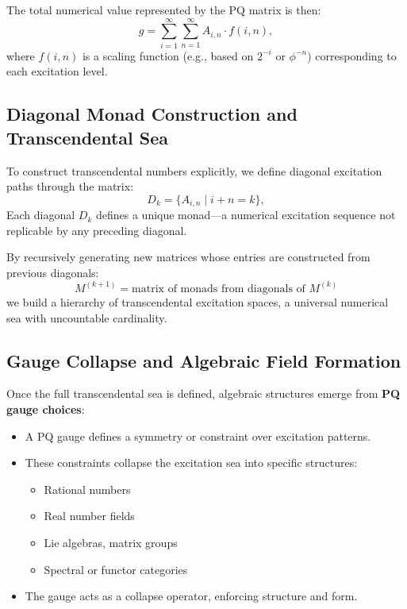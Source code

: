 \documentclass{article}
\begin{document}
The total numerical value represented by the PQ matrix is then:
\begin{equation}
    g = \sum_{i=1}^{\infty} \sum_{n=1}^{\infty} A_{i,n} \cdot f(i, n),
\end{equation}
where $f(i, n)$ is a scaling function (e.g., based on $2^{-i}$ or $\phi^{-n}$) corresponding to each excitation level.

\subsection{Diagonal Monad Construction and Transcendental Sea}

To construct transcendental numbers explicitly, we define diagonal excitation paths through the matrix:
\begin{equation}
    D_k = \{A_{i,n} \mid i + n = k\},
\end{equation}
Each diagonal $D_k$ defines a unique monad---a numerical excitation sequence not replicable by any preceding diagonal.

By recursively generating new matrices whose entries are constructed from previous diagonals:
\begin{equation}
    M^{(k+1)} = \text{matrix of monads from diagonals of } M^{(k)}
\end{equation}
we build a hierarchy of transcendental excitation spaces, a universal numerical sea with uncountable cardinality.

\subsection{Gauge Collapse and Algebraic Field Formation}

Once the full transcendental sea is defined, algebraic structures emerge from \textbf{PQ gauge choices}:
\begin{itemize}
    \item A PQ gauge defines a symmetry or constraint over excitation patterns.
    \item These constraints collapse the excitation sea into specific structures:
        \begin{itemize}
            \item Rational numbers
            \item Real number fields
            \item Lie algebras, matrix groups
            \item Spectral or functor categories
        \end{itemize}
    \item The gauge acts as a collapse operator, enforcing structure and form.
\end{itemize}
\end{document}

